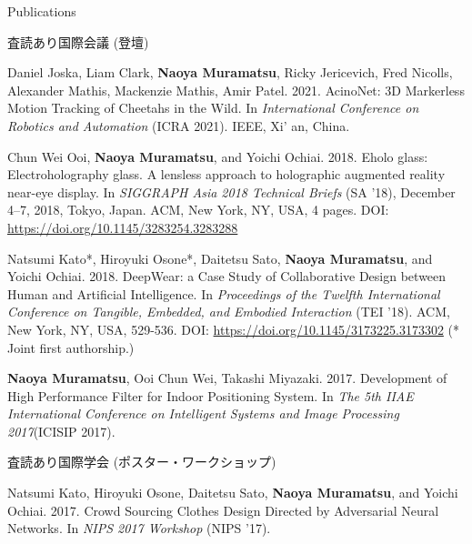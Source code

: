 \documentclass{resume} %
\begin{document}
\begin{rSection}{Publications} \itemsep 4pt



    \begin{rSubsection}{査読あり国際会議 (登壇)}{}{}{}{}
        \item Daniel Joska, Liam Clark, \textbf{Naoya Muramatsu}, Ricky Jericevich, Fred Nicolls, Alexander Mathis, Mackenzie Mathis, Amir Patel. 2021. AcinoNet: 3D Markerless Motion Tracking of Cheetahs in the Wild. In \textit{International Conference on Robotics and Automation} (ICRA 2021). IEEE, Xi' an, China.

        \item Chun Wei Ooi, \textbf{Naoya Muramatsu}, and Yoichi Ochiai. 2018. Eholo glass: Electroholography glass. A lensless approach to holographic augmented reality near-eye display. In \textit{SIGGRAPH Asia 2018 Technical Briefs} (SA ’18), December 4–7, 2018, Tokyo, Japan. ACM, New York, NY, USA, 4 pages. DOI: \url{https://doi.org/10.1145/3283254.3283288}

        \item Natsumi Kato*, Hiroyuki Osone*, Daitetsu Sato, \textbf{Naoya Muramatsu}, and Yoichi Ochiai. 2018. DeepWear: a Case Study of Collaborative Design between Human and Artificial Intelligence. In \textit{Proceedings of the Twelfth International Conference on Tangible, Embedded, and Embodied Interaction} (TEI ’18). ACM, New York, NY, USA, 529-536. DOI: \url{https://doi.org/10.1145/3173225.3173302} (* Joint first authorship.)

        \item \textbf{Naoya Muramatsu}, Ooi Chun Wei, Takashi Miyazaki. 2017. Development of High Performance Filter for Indoor Positioning System. In \textit{The 5th IIAE International Conference on Intelligent Systems and Image Processing 2017}(ICISIP 2017).
    \end{rSubsection}

    \begin{rSubsection}{査読あり国際学会 (ポスター・ワークショップ)}{}{}{}{}
        \item Natsumi Kato, Hiroyuki Osone, Daitetsu Sato, \textbf{Naoya Muramatsu}, and Yoichi Ochiai. 2017. Crowd Sourcing Clothes Design Directed by Adversarial Neural Networks. In \textit{NIPS 2017 Workshop} (NIPS ’17).


\end{rSubsection}
\end{rSection}
\end{document}
